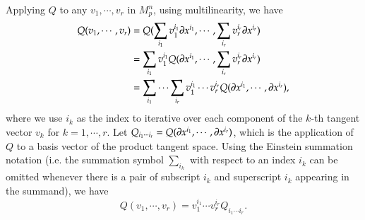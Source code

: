 \documentclass[11pt, a4paper]{book}
\begin{document}
Applying $Q$ to any $v_1, \cdots, v_r$ in $M_p^n$, using multilinearity, we have
\begin{equation}
  \begin{aligned}
    Q(v_1,\cdots,v_r) &= Q(\sum_{i_1}v_1^{i_1} \boldsymbol{\partial}x^{i_1}, \cdots,
    \sum_{i_r}v_r^{i_r} \boldsymbol{\partial}x^{i_r}) \\
    &= \sum_{i_1}v_1^{i_1} Q(\boldsymbol{\partial}x^{i_1},\cdots,\sum_{i_r}v_r^{i_r}\boldsymbol{\partial}x^{i_r}) \\
    &= \sum_{i_1}\cdots\sum_{i_r}v_1^{i_1}\cdots v_r^{i_r}
    Q(\boldsymbol{\partial}x^{i_1},\cdots,\boldsymbol{\partial}x^{i_r}),
  \end{aligned}
\end{equation}
where we use $i_k$ as the index to iterative over each component of the $k$-th tangent
vector $v_k$ for $k=1,\cdots,r$. Let
$Q_{i_1\cdots i_r}= Q(\boldsymbol{\partial}x^{i_1},\cdots,\boldsymbol{\partial}x^{i_r})$, which is the
application of $Q$ to a basis vector of the product tangent space. Using the Einstein
summation notation (i.e. the summation symbol $\sum_{i_k}$ with respect to an index $i_k$
can be omitted whenever there is a pair of subscript $i_k$ and superscript $i_k$ appearing
in the summand), we have
\begin{equation}
  \label{eq:covariant-tensor-applied-to-r-vectors}
  Q(v_1,\cdots,v_r) = v_1^{i_1}\cdots v_r^{i_r} Q_{i_1 \cdots i_r}.
\end{equation}
\end{document}
